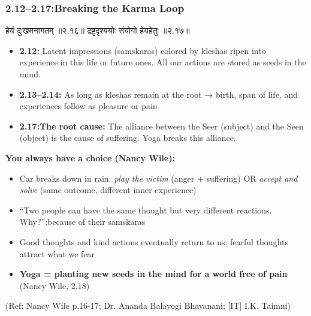 \begin{frame}[fragile]\frametitle{2.12–2.17:Breaking the Karma Loop}

\begin{sanskrit}
हेयं दुःखमनागतम् ॥२.१६॥
द्रष्टृदृश्ययोः संयोगो हेयहेतुः ॥२.१७॥
\end{sanskrit}

\begin{itemize}
\item \textbf{2.12:} Latent impressions (samskaras) colored by kleshas ripen into experience:in this life or future ones. All our actions are stored as seeds in the mind.
\item \textbf{2.13–2.14:} As long as kleshas remain at the root → birth, span of life, and experiences follow as pleasure or pain
\item \textbf{2.17:The root cause:} The alliance between the Seer (subject) and the Seen (object) is the cause of suffering. Yoga breaks this alliance.
\end{itemize}

\textbf{You always have a choice (Nancy Wile):}
\begin{itemize}
\item Car breaks down in rain: \emph{play the victim} (anger + suffering) OR \emph{accept and solve} (same outcome, different inner experience)
\item ``Two people can have the same thought but very different reactions. Why?'':because of their samskaras
\item Good thoughts and kind actions eventually return to us; fearful thoughts attract what we fear
\item \textbf{Yoga = planting new seeds in the mind for a world free of pain} (Nancy Wile, 2.18)
\end{itemize}

\tiny{(Ref: Nancy Wile p.16-17; Dr. Ananda Balayogi Bhavanani; [IT] I.K. Taimni)}

\end{frame}

